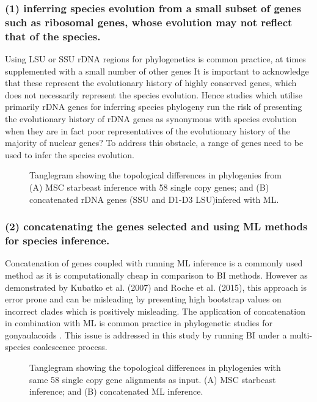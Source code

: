 \documentclass[12pt]{article}
\begin{document}
\subsubsection*{(1) inferring species evolution from a small subset of genes such as ribosomal genes, whose evolution may not reflect that of the species.}
Using LSU or SSU rDNA regions for phylogenetics is common practice, at times supplemented with a small number of other genes \cite{shalchian2006combined,zhang2007three,saldarriaga2004molecular,murray2005improving,hoppenrath2010dinoflagellate} 
It is important to acknowledge that these represent the evolutionary history of highly conserved genes, which does not necessarily represent the species evolution. 
Hence studies which utilise primarily rDNA genes for inferring species phylogeny run the risk of presenting the evolutionary history of rDNA genes as synonymous with species evolution when they are in fact poor representatives of the evolutionary history of the majority of nuclear genes?
To address this obstacle, a range of genes need to be used to infer the species evolution.

\FloatBarrier 
\begin{figure} 
\caption{Tanglegram showing the topological differences in phylogenies from (A) MSC starbeast inference with 58 single copy genes; and (B) concatenated rDNA genes (SSU and D1-D3 LSU)infered with ML.} 
\label{fig:tanglerdna}
\end{figure} 
\FloatBarrier

\subsubsection*{(2) concatenating the genes selected and using ML methods for species inference.}
Concatenation of genes coupled with running ML inference is a commonly used method as it is computationally cheap in comparison to BI methods. 
However as demonstrated by Kubatko et al. (2007) and Roche et al. (2015), this approach is error prone and can be misleading by presenting high bootstrap values on incorrect clades which is positively misleading.
The application of concatenation in combination with ML is common practice in phylogenetic studies for gonyaulacoids  \cite{shalchian2006combined,zhang2007three,saldarriaga2004molecular,murray2005improving,hoppenrath2010dinoflagellate}.
This issue is addressed in this study by running BI under a multi-species coalescence process.
\FloatBarrier 
\begin{figure} 
\caption{Tanglegram showing the topological differences in phylogenies with same 58 single copy gene alignments as input. (A) MSC starbeast inference; and (B) concatenated ML inference.} 
\label{fig:tangleconcat}
\end{figure} 
\FloatBarrier
\end{document}
